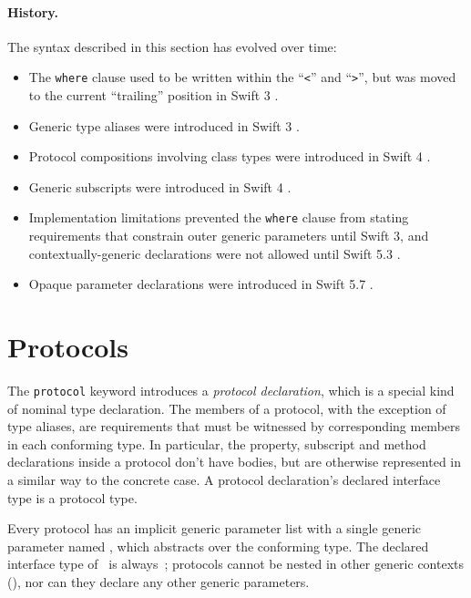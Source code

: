 \documentclass[../generics]{subfiles}
\begin{document}
\paragraph{History.} The syntax described in this section has evolved over time:
\begin{itemize}
\item The \texttt{where} clause used to be written within the ``\texttt{<}'' and ``\texttt{>}'', but was moved to the current ``trailing'' position in Swift 3 \cite{se0081}.
\item Generic type aliases were introduced in Swift 3 \cite{se0048}.
\item Protocol compositions involving class types were introduced in Swift 4 \cite{se0156}.
\item Generic subscripts were introduced in Swift 4 \cite{se0148}.
\item Implementation limitations prevented the \texttt{where} clause from stating requirements that constrain outer generic parameters until Swift 3, and contextually-generic declarations were not allowed until Swift 5.3 \cite{se0261}.
\item Opaque parameter declarations were introduced in Swift 5.7 \cite{se0341}.
\end{itemize}

\section{Protocols}\label{protocols}

The \texttt{protocol} keyword introduces a \emph{protocol declaration}, which is a special kind of nominal type declaration. The members of a protocol, with the exception of type aliases, are requirements that must be witnessed by corresponding members in each conforming type. In particular, the property, subscript and method declarations inside a protocol don't have bodies, but are otherwise represented in a similar way to the concrete case. A protocol declaration's declared interface type is a protocol type.

Every protocol has an implicit generic parameter list with a single generic parameter named \tSelf, which abstracts over the conforming type. The declared interface type of \tSelf\ is always~\rT; protocols cannot be nested in other generic contexts (), nor can they declare any other generic parameters.
\end{document}
